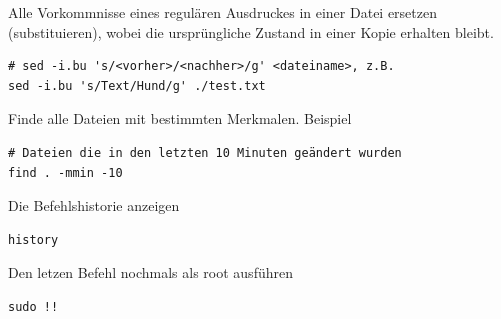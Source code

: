 \documentclass[]{article}
\begin{document}
Alle Vorkommnisse eines regulären Ausdruckes in einer Datei ersetzen (substituieren), wobei die ursprüngliche Zustand in einer Kopie erhalten bleibt.
\begin{verbatim}
# sed -i.bu 's/<vorher>/<nachher>/g' <dateiname>, z.B.
sed -i.bu 's/Text/Hund/g' ./test.txt
\end{verbatim}

Finde alle Dateien mit bestimmten Merkmalen. Beispiel
\begin{verbatim}
# Dateien die in den letzten 10 Minuten geändert wurden 
find . -mmin -10
\end{verbatim}

Die Befehlshistorie anzeigen
\begin{verbatim}
history
\end{verbatim}

Den letzen Befehl nochmals als root ausführen
\begin{verbatim}
sudo !!
\end{verbatim}


\printbibliography
\end{document}
